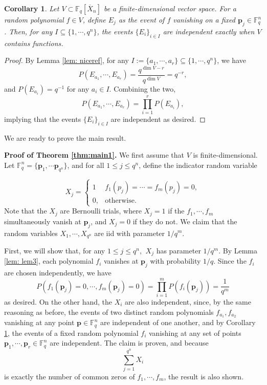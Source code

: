 \documentclass[12pt]{amsart}
\newtheorem{corollary}[theorem]{Corollary}
\theoremstyle{definition}
\newcommand{\FF}{\mathbb{F} }
\newcommand{\bp}{\mathbf{p} }
\begin{document}
\begin{corollary}\label{cor: nice}
Let $V \subset \FF_q[\overline{X}_n]$ be a finite-dimensional vector space. For a random polynomial $f \in V$, define $E_j$ as the event of $f$ vanishing on a fixed $\bp_j \in \FF_q^n$. Then, for any $I \subseteq \{1, \cdots, q^n \}$, the events $\{E_i \}_{i \in I}$ are independent exactly when $V$ contains functions.
\end{corollary}

\begin{proof}
By Lemma \ref{lem: niceref}, for any $I := \{a_1, \cdots, a_r \} \subseteq \{1, \cdots, q^n \}$, we have 
\[
P(E_{a_1}, \cdots , E_{a_r}) = \frac{q^{\dim V-r}}{q^{\dim V}} = q^{-r}, 
\]
and $P(E_{a_i}) = q^{-1}$ for any $a_i \in I$. Combining the two, \[ P(E_{a_1}, \cdots , E_{a_r}) = \prod_{i=1}^{r} P(E_{a_i}), \] implying that the events $\{E_i \}_{i \in I}$ are independent as desired.
\end{proof}

We are ready to prove the main result.

\noindent
\textbf{Proof of Theorem \ref{thm:main1}.} 
We first assume that $V$ is finite-dimensional. Let $\FF_q^n = \{\bp_1, \cdots \bp_{q^n} \}$, and for all $1 \le j \le  q^n$, define the indicator random variable

\[
    X_{j}  = \begin{cases}
        1 & f_1(p_j) = \cdots = f_m(p_j) = 0,\\
        0, & \text{otherwise}.
    \end{cases}
\]
Note that the $X_{j}$ are Bernoulli trials, where $X_{j} = 1$ if the $f_1, \cdots , f_m$ simultaneously vanish at $\bp_j$, and $X_{j} = 0$ if they do not. We claim that the random variables $X_1, \cdots , X_{q^n}$ are iid with parameter $1/q^{m}$. 

First, we will show that, for any $1 \le j \le q^n$, $\ X_j$ has parameter $1/q^m$. By Lemma \ref{lem: lem3}, each polynomial $f_i$ vanishes at $\bp_j$ with probability $1/q$. Since the $f_i$ are chosen independently, we have
\[
P(f_1(\bp_j) = 0, \cdots ,  f_m(\bp_j) = 0) = \prod_{i=1}^{m}P(f_i(\bp_j)) = \frac{1}{q^m}
\]
as desired. On the other hand, the $X_i$ are also independent, since, by the same reasoning as before, the events of two distinct random polynomials $f_{a_1}, f_{a_2}$ vanishing at any point $\bp \in \FF_q^n$ are independent of one another, and by Corollary \ref{cor: nice}, the events of a fixed random polynomial $f_i$ vanishing at any set of points $\bp_1, \cdots , \bp_r \in \FF_q^n$ are independent. The claim is proven, and because
\[
\sum_{j=1}^{q^n}X_i
\]
is exactly the number of common zeros of $f_1, \cdots , f_m$, the result is also shown.
\end{document}
